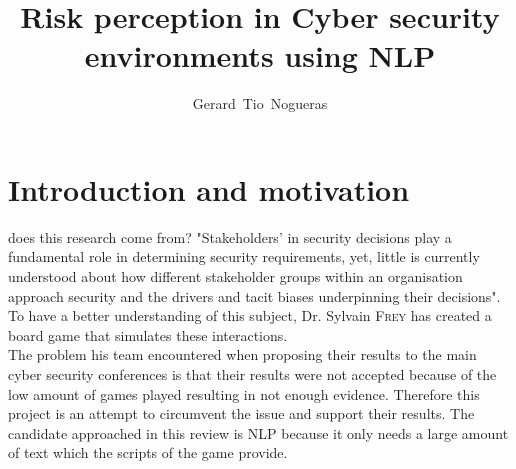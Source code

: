 \documentclass[12pt,journal,compsoc]{IEEEtran}
\begin{document}
\title{Risk perception in Cyber security environments using NLP}


\author{Gerard~Tio~Nogueras}


\maketitle

\IEEEdisplaynotcompsoctitleabstractindextext

\IEEEpeerreviewmaketitle

\section{Introduction and motivation}

 does this research come from?
"Stakeholders’ in security decisions play a fundamental role in determining security requirements, yet, little is currently understood about how different stakeholder groups within an organisation approach security and the drivers and tacit biases underpinning their decisions"\cite{DnD}. To have a better understanding of this subject, Dr. Sylvain \textsc{Frey} has created a board game that simulates these interactions. \\
The problem his team encountered when proposing their results to the main cyber security conferences is that their results were not accepted because of the low amount of games played resulting in not enough evidence.
Therefore this project is an attempt to circumvent the issue and support their results. The candidate approached in this review is NLP because it only needs a large amount of text which the scripts of the game provide.
\end{document}
